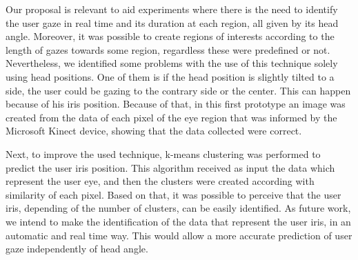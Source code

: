 \documentclass[10pt, conference]{IEEEtran}
\begin{document}
	Our proposal is relevant to aid experiments where there is the need to identify the user gaze in real time and its duration at each region, all given by its head angle.
	Moreover, it was possible to create regions of interests according to the length of gazes towards some region, regardless these were predefined or not.
	Nevertheless, we identified some problems with the use of this technique solely using head positions. 
	One of them is if the head position is slightly tilted to a side, the user could be gazing to the contrary side or the center. 
	This can happen because of his iris position. 
	Because of that, in this first prototype an image was created from the data of each pixel of the eye region that was informed by the Microsoft Kinect device, showing that the data collected were correct. 

	Next, to improve the used technique, k-means clustering was performed to predict the user iris position. 
	This algorithm received as input the data which represent the user eye, and then the clusters were created according with similarity of each pixel. 
	Based on that, it was possible to perceive that the user iris, depending of the number of clusters, can be easily identified.
	As future work, we intend to make the identification of the data that represent the user iris, in an automatic and real time way. 
	This would allow a more accurate prediction of user gaze independently of head angle.



\balance

\balance
\end{document}

